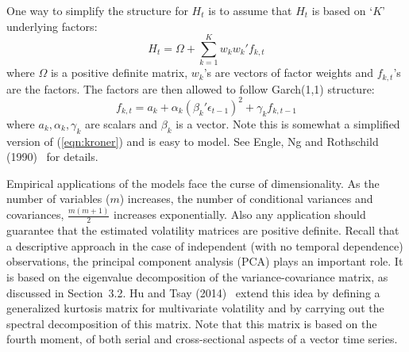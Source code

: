One way to simplify the structure for $H_t$ is to assume that $H_t$ is based on `$K$' underlying factors:
	\begin{equation}\label{eqn:factorH}
	H_t= \Omega + \sum_{k=1}^K w_k w_k' f_{k,t}
	\end{equation}
where $\Omega$ is a positive definite matrix, $w_k$'s are vectors of factor weights and $f_{k,t}$'s are the factors. The factors are then allowed to follow Garch(1,1) structure:
	\begin{equation}\label{eqn:garchfactor}
	f_{k,t}= a_k + \alpha_k \left(\beta_k' \epsilon_{t-1}\right)^2 + \gamma_k f_{k,t-1}
	\end{equation}
where $a_k,\alpha_k,\gamma_k$ are scalars and $\beta_k$ is a vector. Note this is somewhat a simplified version of (\ref{eqn:kroner}) and is easy to model. See Engle, Ng and Rothschild (1990)~\cite{engleng} for details. 


Empirical applications of the models face the curse of dimensionality. As the number of variables ($m$) increases, the number of conditional variances and covariances, $\frac{m(m+1)}{2}$ increases exponentially. Also any application should guarantee that the estimated volatility matrices are positive definite. Recall that a descriptive approach in the case of independent (with no temporal dependence) observations, the principal component analysis (PCA) plays an important role. It is based on the eigenvalue decomposition of the variance-covariance matrix, as discussed in Section~3.2. Hu and Tsay (2014)~\cite{hutsay14} extend this idea by defining a generalized kurtosis matrix for multivariate volatility and by carrying out the spectral decomposition of this matrix. Note that this matrix is based on the fourth moment, of both serial and cross-sectional aspects of a vector time series.


